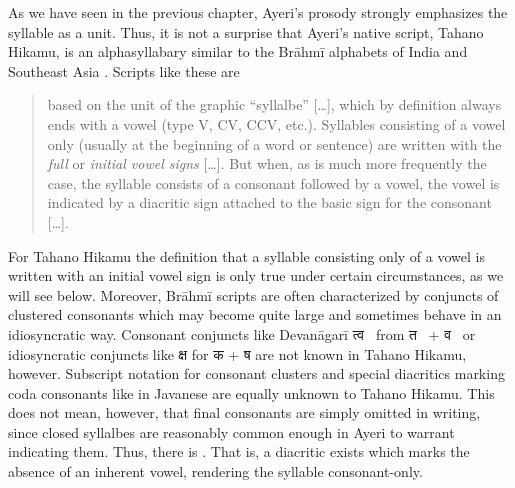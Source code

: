 As we have seen in the previous chapter, Ayeri's prosody strongly emphasizes 
the syllable as a unit. Thus, it is not a surprise that Ayeri's native script,
Tahano Hikamu, is an alphasyllabary similar to the Brāhmī alphabets of 
India and Southeast Asia \parencites{salomon1996}{court1996}. Scripts like these are 

\blockcquote[376]{salomon1996}{based on the unit of the graphic 
\enquote{syllalbe} […], which by definition always ends with a vowel (type V, 
CV, CCV, etc.). Syllables consisting of a vowel only (usually at the beginning 
of a word or sentence) are written with the \emph{full} or \emph{initial vowel 
signs} […]. But when, as is much more frequently the case, the syllable 
consists of a consonant followed by a vowel, the vowel is indicated by a 
diacritic sign attached to the basic sign for the consonant […].}

For Tahano Hikamu the definition that a syllable consisting only of a vowel is
written with an initial vowel sign is only true under certain circumstances, as
we will see below. Moreover, Brāhmī scripts are often characterized by
conjuncts of clustered consonants which may become quite large and sometimes
behave in an idiosyncratic way. Consonant conjuncts like Devanāgarī {\FS
त्व}~ from {\FS त}~ + {\FS व}~ or idiosyncratic
conjuncts like {\FS क्ष}  for {\FS क}  + {\FS ष} 
are not known in Tahano Hikamu, however. Subscript notation for consonant
clusters and special diacritics marking coda consonants like in Javanese
\citep[478--479]{kuipersmcdermott1996} are equally unknown to Tahano Hikamu.
This does not mean, however, that final consonants are simply omitted in
writing, since closed syllalbes are reasonably common enough in Ayeri to
warrant indicating them. Thus, there is
. That is, a diacritic exists which marks the absence of an inherent
vowel, rendering the syllable consonant-only.

